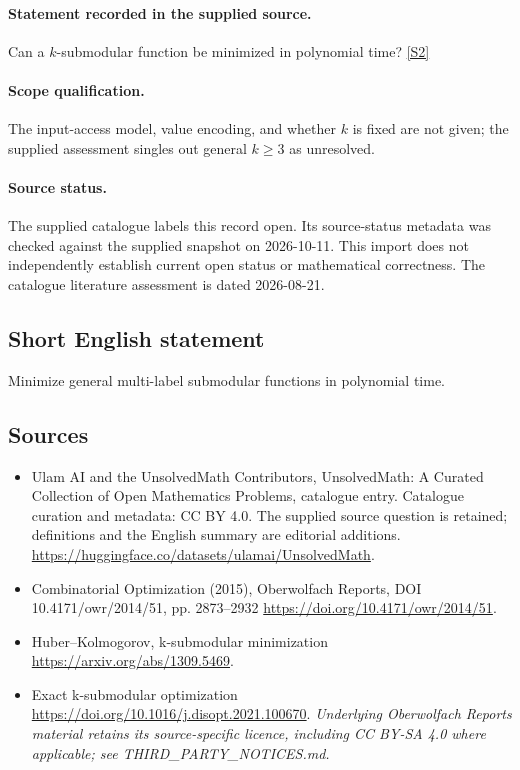 \documentclass[11pt]{article}
\begin{document}
\paragraph{Statement recorded in the supplied source.}
Can a $k$-submodular function be minimized in polynomial time? \href{https://doi.org/10.4171/owr/2014/51}{[S2]}
\paragraph{Scope qualification.}
The input-access model, value encoding, and whether $k$ is fixed are not given; the supplied assessment singles out general $k\geq3$ as unresolved.
\paragraph{Source status.}
The supplied catalogue labels this record open. Its source-status metadata was checked against the supplied snapshot on 2026-10-11. This import does not independently establish current open status or mathematical correctness. The catalogue literature assessment is dated 2026-08-21.
\subsection{Short English statement}
Minimize general multi-label submodular functions in polynomial time.
\subsection{Sources}
\begin{itemize}
\item[S1] Ulam AI and the UnsolvedMath Contributors, UnsolvedMath: A Curated Collection of Open Mathematics Problems, catalogue entry. Catalogue curation and metadata: CC BY 4.0. The supplied source question is retained; definitions and the English summary are editorial additions.
\url{https://huggingface.co/datasets/ulamai/UnsolvedMath}.
\item[S2] Combinatorial Optimization (2015), Oberwolfach Reports, DOI 10.4171/owr/2014/51, pp. 2873--2932
\url{https://doi.org/10.4171/owr/2014/51}.
\item[S3] Huber--Kolmogorov, k-submodular minimization
\url{https://arxiv.org/abs/1309.5469}.
\item[S4] Exact k-submodular optimization
\url{https://doi.org/10.1016/j.disopt.2021.100670}.
\textit{Underlying Oberwolfach Reports material retains its source-specific licence, including CC BY-SA 4.0 where applicable; see THIRD\_PARTY\_NOTICES.md.}
\end{itemize}
\end{document}
